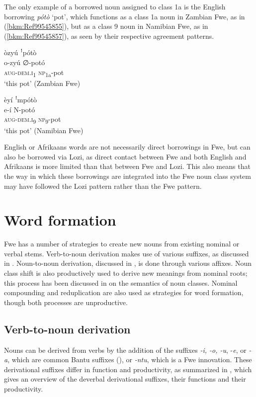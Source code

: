 The only example of a borrowed noun assigned to class 1a is the English borrowing \textit{pótò} ‘pot’, which functions as a class 1a noun in Zambian Fwe, as in (\ref{bkm:Ref99545855}), but as a class 9 noun in Namibian Fwe, as in (\ref{bkm:Ref99545857}), as seen by their respective agreement patterns.

\ea
\label{bkm:Ref99545855}
òzyú ꜝpótò\\
\gll o-zyú    ∅-potó\\
\textsc{aug}-\textsc{dem}.\textsc{i}\textsubscript{1}  \textsc{np}\textsubscript{1a}-pot\\
\glt ‘this pot’ (Zambian Fwe)
\z\largerpage

\ea
\label{bkm:Ref99545857}
èyí ꜝmpótò\\
\gll e-í    N-potó\\
\textsc{aug}-\textsc{dem}.\textsc{i}\textsubscript{9}  \textsc{np}\textsubscript{9}-pot\\
\glt ‘this pot’ (Namibian Fwe)
\z

English or Afrikaans words are not necessarily direct borrowings in Fwe, but can also be borrowed via Lozi, as direct contact between Fwe and both English and Afrikaans is more limited than that between Fwe and Lozi. This also means that the way in which these borrowings are integrated into the Fwe noun class system may have followed the Lozi pattern rather than the Fwe pattern.

\section{Word formation}
\label{bkm:Ref70948964}\hypertarget{Toc75352642}{}\label{bkm:Ref451514817}
Fwe has a number of strategies to create new nouns from existing nominal or verbal stems. Verb-to-noun derivation makes use of various suffixes, as discussed in . Noun-to-noun derivation, discussed in , is done through various affixes. Noun class shift is also productively used to derive new meanings from nominal roots; this process has been discussed in  on the semantics of noun classes. Nominal compounding and reduplication are also used as strategies for word formation, though both processes are unproductive.

\subsection{Verb-to-noun derivation}
\label{bkm:Ref444251366}\hypertarget{Toc75352643}{}
Nouns can be derived from verbs by the addition of the suffixes \textit{-i, -o, -u}, -\textit{e}, or \textit{-a}, which are common Bantu suffixes (\citealt{SchadebergBostoen2019}), or \textit{-ntu}, which is a Fwe innovation. These derivational suffixes differ in function and productivity, as summarized in , which gives an overview of the deverbal derivational suffixes, their functions and their productivity.

